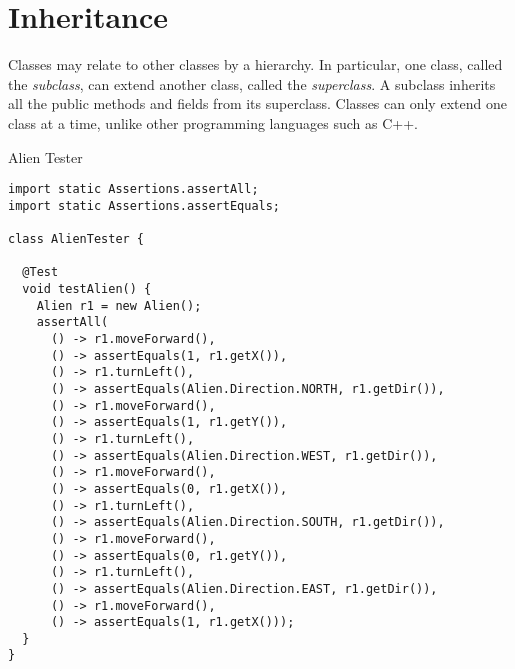 \section{Inheritance}

Classes may relate to other classes by a hierarchy. In particular, one class, called the \textit{subclass}, can extend another class, called the \textit{superclass}. A subclass inherits all the public methods and fields from its superclass. Classes can only extend one class at a time, unlike other programming languages such as C++. 


\begin{cl}{Alien Tester}
\begin{lstlisting}[language=MyJava]
import static Assertions.assertAll;
import static Assertions.assertEquals;

class AlienTester {

  @Test
  void testAlien() {
    Alien r1 = new Alien();
    assertAll(
      () -> r1.moveForward(),
      () -> assertEquals(1, r1.getX()),
      () -> r1.turnLeft(),
      () -> assertEquals(Alien.Direction.NORTH, r1.getDir()),
      () -> r1.moveForward(),
      () -> assertEquals(1, r1.getY()),
      () -> r1.turnLeft(),
      () -> assertEquals(Alien.Direction.WEST, r1.getDir()),
      () -> r1.moveForward(),
      () -> assertEquals(0, r1.getX()),
      () -> r1.turnLeft(),
      () -> assertEquals(Alien.Direction.SOUTH, r1.getDir()),
      () -> r1.moveForward(),
      () -> assertEquals(0, r1.getY()),
      () -> r1.turnLeft(),
      () -> assertEquals(Alien.Direction.EAST, r1.getDir()),
      () -> r1.moveForward(),
      () -> assertEquals(1, r1.getX()));
  }
}
\end{lstlisting}
\end{cl}

